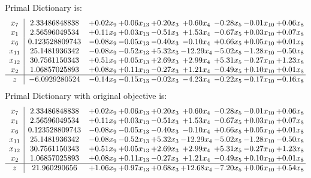 \documentclass[8pt]{article}
\begin{document}
Primal Dictionary is:
\[\begin{array}{c| c c@{\hskip 2pt} c@{\hskip 2pt} c@{\hskip 2pt} c@{\hskip 2pt} c@{\hskip 2pt} c@{\hskip 2pt} c@{\hskip 2pt} }
 x_{7}   &  2.33486848838 & +  0.02 x_{9} & +  0.06 x_{13} & +  0.20 x_{3} & +  0.60 x_{4} & -0.28 x_{5} & -0.01 x_{10} & +  0.06 x_{8}\\
 x_{1}   &  2.56596049534 & +  0.11 x_{9} & +  0.03 x_{13} & -0.51 x_{3} & +  1.53 x_{4} & -0.67 x_{5} & +  0.03 x_{10} & +  0.07 x_{8}\\
 x_{6}   &  0.123528809743 & -0.08 x_{9} & -0.05 x_{13} & -0.40 x_{3} & -0.10 x_{4} & +  0.66 x_{5} & +  0.05 x_{10} & +  0.01 x_{8}\\
 x_{11}   &  25.1481936342 & -0.08 x_{9} & -0.52 x_{13} & +  5.32 x_{3} & -12.29 x_{4} & -5.02 x_{5} & -1.28 x_{10} & -0.50 x_{8}\\
 x_{12}   &  30.7561150343 & +  0.51 x_{9} & +  0.05 x_{13} & +  2.69 x_{3} & +  2.99 x_{4} & +  5.31 x_{5} & -0.27 x_{10} & +  1.23 x_{8}\\
 x_{2}   &  1.06857025893 & +  0.08 x_{9} & +  0.11 x_{13} & -0.27 x_{3} & +  1.21 x_{4} & -0.49 x_{5} & +  0.10 x_{10} & +  0.01 x_{8}\\
\hline
z    &  -6.0929280524 & -0.14 x_{9} & -0.15 x_{13} & -0.02 x_{3} & -4.23 x_{4} & -0.22 x_{5} & -0.17 x_{10} & -0.16 x_{8}\\
\end{array}\]
Primal Dictionary with original objective is:
\[\begin{array}{c| c c@{\hskip 2pt} c@{\hskip 2pt} c@{\hskip 2pt} c@{\hskip 2pt} c@{\hskip 2pt} c@{\hskip 2pt} c@{\hskip 2pt} }
 x_{7}   &  2.33486848838 & +  0.02 x_{9} & +  0.06 x_{13} & +  0.20 x_{3} & +  0.60 x_{4} & -0.28 x_{5} & -0.01 x_{10} & +  0.06 x_{8}\\
 x_{1}   &  2.56596049534 & +  0.11 x_{9} & +  0.03 x_{13} & -0.51 x_{3} & +  1.53 x_{4} & -0.67 x_{5} & +  0.03 x_{10} & +  0.07 x_{8}\\
 x_{6}   &  0.123528809743 & -0.08 x_{9} & -0.05 x_{13} & -0.40 x_{3} & -0.10 x_{4} & +  0.66 x_{5} & +  0.05 x_{10} & +  0.01 x_{8}\\
 x_{11}   &  25.1481936342 & -0.08 x_{9} & -0.52 x_{13} & +  5.32 x_{3} & -12.29 x_{4} & -5.02 x_{5} & -1.28 x_{10} & -0.50 x_{8}\\
 x_{12}   &  30.7561150343 & +  0.51 x_{9} & +  0.05 x_{13} & +  2.69 x_{3} & +  2.99 x_{4} & +  5.31 x_{5} & -0.27 x_{10} & +  1.23 x_{8}\\
 x_{2}   &  1.06857025893 & +  0.08 x_{9} & +  0.11 x_{13} & -0.27 x_{3} & +  1.21 x_{4} & -0.49 x_{5} & +  0.10 x_{10} & +  0.01 x_{8}\\
\hline
z    &  21.960290656 & +  1.06 x_{9} & +  0.97 x_{13} & +  0.68 x_{3} & + 12.68 x_{4} & -7.20 x_{5} & +  0.06 x_{10} & +  0.54 x_{8}\\
\end{array}\]
\end{document}
